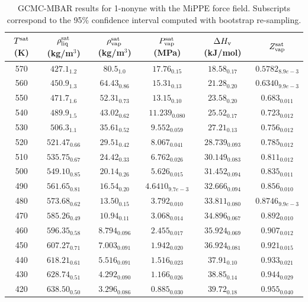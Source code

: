 \documentclass[journal=jctc,manuscript=article]{achemso}
\begin{document}
\begin{table}[htb!]
	\caption{GCMC-MBAR results for 1-nonyne with the MiPPE force field. Subscripts correspond to the 95\% confidence interval computed with bootstrap re-sampling.}
	\begin{center}
		\begin{tabular}{|c|c|c|c|c|c|}
			\hline
			$T^{\rm sat}$ (K) & $\rho_{\rm liq}^{\rm sat}$ (kg/m$^3$) & $\rho_{\rm vap}^{\rm sat}$ (kg/m$^3$) & $P_{\rm vap}^{\rm sat}$ (MPa) & $\Delta H_{\rm v}$ (kJ/mol) & $Z_{\rm vap}^{\rm sat}$ \\ \hline
			570 & $427.1_{1.2}$ & $80.5_{1.0}$ & $17.76_{0.15}$ & $18.58_{0.17}$ & $0.5782_{8.9e-3}$ \\
			560 & $450.9_{1.3}$ & $64.43_{0.86}$ & $15.31_{0.13}$ & $21.28_{0.20}$ & $0.6340_{9.9e-3}$ \\
			550 & $471.7_{1.6}$ & $52.31_{0.73}$ & $13.15_{0.10}$ & $23.58_{0.20}$ & $0.683_{0.011}$ \\
			540 & $489.9_{1.5}$ & $43.02_{0.62}$ & $11.239_{0.080}$ & $25.52_{0.17}$ & $0.723_{0.012}$ \\
			530 & $506.3_{1.1}$ & $35.61_{0.52}$ & $9.552_{0.059}$ & $27.21_{0.13}$ & $0.756_{0.012}$ \\
			520 & $521.47_{0.66}$ & $29.51_{0.42}$ & $8.067_{0.041}$ & $28.739_{0.093}$ & $0.785_{0.012}$ \\
			510 & $535.75_{0.67}$ & $24.42_{0.33}$ & $6.762_{0.026}$ & $30.149_{0.083}$ & $0.811_{0.012}$ \\
			500 & $549.10_{0.85}$ & $20.14_{0.26}$ & $5.626_{0.015}$ & $31.452_{0.094}$ & $0.835_{0.011}$ \\
			490 & $561.65_{0.81}$ & $16.54_{0.20}$ & $4.6410_{9.7e-3}$ & $32.666_{0.094}$ & $0.856_{0.010}$ \\
			480 & $573.68_{0.62}$ & $13.50_{0.15}$ & $3.792_{0.010}$ & $33.811_{0.080}$ & $0.8746_{9.9e-3}$ \\
			470 & $585.26_{0.49}$ & $10.94_{0.11}$ & $3.068_{0.014}$ & $34.896_{0.067}$ & $0.892_{0.010}$ \\
			460 & $596.35_{0.58}$ & $8.794_{0.096}$ & $2.455_{0.017}$ & $35.924_{0.069}$ & $0.907_{0.012}$ \\
			450 & $607.27_{0.71}$ & $7.003_{0.091}$ & $1.942_{0.020}$ & $36.924_{0.081}$ & $0.921_{0.015}$ \\
			440 & $618.21_{0.61}$ & $5.516_{0.091}$ & $1.516_{0.023}$ & $37.91_{0.10}$ & $0.933_{0.021}$ \\
			430 & $628.74_{0.51}$ & $4.292_{0.090}$ & $1.166_{0.026}$ & $38.85_{0.14}$ & $0.944_{0.029}$ \\
			420 & $638.50_{0.50}$ & $3.296_{0.086}$ & $0.885_{0.030}$ & $39.72_{0.18}$ & $0.955_{0.040}$ \\
			\hline
		\end{tabular}
	\end{center}
\end{table}
\end{document}
